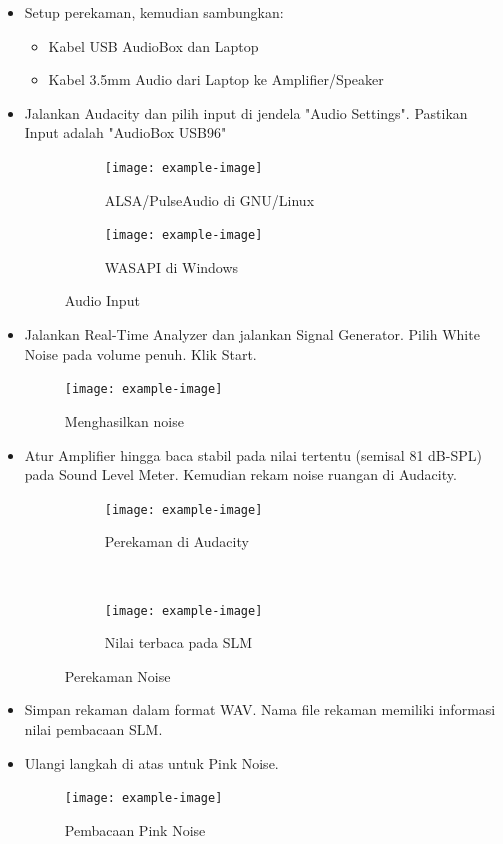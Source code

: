 \documentclass{article}
\begin{document}
	\begin{itemize}
		\item Setup perekaman, kemudian sambungkan:
		\begin{itemize}
			\item Kabel USB AudioBox dan Laptop
			\item Kabel 3.5mm Audio dari Laptop ke Amplifier/Speaker
		\end{itemize}
	
		\item Jalankan Audacity dan pilih input di jendela "Audio Settings".
		Pastikan Input adalah "AudioBox USB96"
		
		\begin{figure}[H]
			\centering
			\begin{subfigure}[]{.55\textwidth}
				\texttt{[image: example-image]}
				\caption{ALSA/PulseAudio di GNU/Linux}
			\end{subfigure}
			\begin{subfigure}[]{.35\textwidth}
				\texttt{[image: example-image]}
				\caption{WASAPI di Windows}
			\end{subfigure}
			\caption{Audio Input}
		\end{figure}
	
		\item Jalankan Real-Time Analyzer dan jalankan Signal Generator.
		Pilih White Noise pada volume penuh. Klik Start.
		
		\begin{figure}[H]
			\centering
			\texttt{[image: example-image]}
			\caption{Menghasilkan noise}
		\end{figure}
		
		\item Atur Amplifier hingga baca stabil pada nilai tertentu (semisal 81 dB-SPL) pada Sound Level Meter.
		Kemudian rekam noise ruangan di Audacity.
		
		\begin{figure}[H]
			\centering
			\begin{subfigure}[]{.8\textwidth}
				\texttt{[image: example-image]}
				\caption{Perekaman di Audacity}
			\end{subfigure}
			\\
			\begin{subfigure}[]{.5\textwidth}
				\texttt{[image: example-image]}
				\caption{Nilai terbaca pada SLM}
			\end{subfigure}
			\caption{Perekaman Noise}
		\end{figure}
		
		\item Simpan rekaman dalam format WAV.
		Nama file rekaman memiliki informasi nilai pembacaan SLM.
		
		\item Ulangi langkah di atas untuk Pink Noise.
		
		\begin{figure}[H]
			\centering
			\texttt{[image: example-image]}
			\caption{Pembacaan Pink Noise}
		\end{figure}
	\end{itemize}
\end{document}
